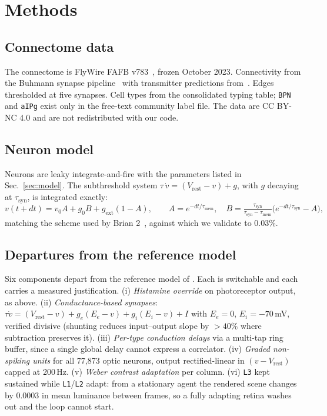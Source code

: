 \documentclass[10pt,twoside]{article}
\newcommand{\cell}[1]{\texttt{#1}}
\begin{document}
\section{Methods}

\subsection{Connectome data}

The connectome is FlyWire FAFB v783~\citep{dorkenwald2024,schlegel2024}, frozen
October 2023. Connectivity from the Buhmann synapse
pipeline~\citep{buhmann2021} with transmitter predictions
from~\citet{eckstein2024}. Edges thresholded at five synapses. Cell types from
the consolidated typing table; \cell{BPN} and \cell{aIPg} exist only in the
free-text community label file. The data are CC BY-NC 4.0 and are not
redistributed with our code.

\subsection{Neuron model}

Neurons are leaky integrate-and-fire with the parameters listed in
Sec.~\ref{sec:model}. The subthreshold system
$\tau\,\dot v=(V_{\mathrm{rest}}-v)+g$, with $g$ decaying at
$\tau_{\mathrm{syn}}$, is integrated exactly:
\[
v(t{+}dt) = v_0 A + g_0 B + g_{\mathrm{ext}}(1-A),\qquad
A=e^{-dt/\tau_{\mathrm{mem}}},\quad
B=\tfrac{\tau_{\mathrm{syn}}}{\tau_{\mathrm{syn}}-\tau_{\mathrm{mem}}}
\bigl(e^{-dt/\tau_{\mathrm{syn}}}-A\bigr),
\]
matching the scheme used by Brian 2~\citep{stimberg2019}, against which we
validate to 0.03\%.

\subsection{Departures from the reference model}

Six components depart from the reference model of \citet{shiu2024}. Each is
switchable and each carries a measured justification. (i) \emph{Histamine override} on
photoreceptor output, as above. (ii) \emph{Conductance-based synapses}:
$\tau\dot v=(V_{\mathrm{rest}}-v)+g_e(E_e-v)+g_i(E_i-v)+I$ with $E_e=0$,
$E_i=-70$\,mV, verified divisive (shunting reduces input--output slope by
$>40\%$ where subtraction preserves it). (iii) \emph{Per-type conduction
delays} via a multi-tap ring buffer, since a single global delay cannot express
a correlator. (iv) \emph{Graded non-spiking units} for all 77{,}873 optic
neurons, output rectified-linear in $(v-V_{\mathrm{rest}})$ capped at 200\,Hz.
(v) \emph{Weber contrast adaptation} per column. (vi) \cell{L3} kept sustained
while \cell{L1}/\cell{L2} adapt: from a stationary agent the rendered scene
changes by 0.0003 in mean luminance between frames, so a fully adapting retina
washes out and the loop cannot start.
\end{document}
